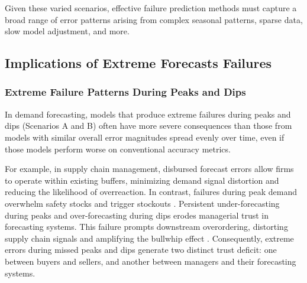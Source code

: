 \documentclass[12pt]{article}
\begin{document}
Given these varied scenarios, effective failure prediction methods must capture a broad range of error patterns arising from complex seasonal patterns, sparse data, slow model adjustment, and more.

\subsection{Implications of Extreme Forecasts Failures}

\subsubsection{Extreme Failure Patterns During Peaks and Dips}

In demand forecasting, models that produce extreme failures during peaks and dips (Scenarios A and B) often have more severe consequences than those from models with similar overall error magnitudes spread evenly over time, even if those models perform worse on conventional accuracy metrics. 

For example, in supply chain management, disbursed forecast errors allow firms to operate within existing buffers, minimizing demand signal distortion and reducing the likelihood of overreaction. In contrast, failures during peak demand overwhelm safety stocks and trigger stockouts \citep{bray2019}. Persistent under-forecasting during peaks and over-forecasting during dips erodes managerial trust in forecasting systems. This failure prompts downstream overordering, distorting supply chain signals and amplifying the bullwhip effect \citep{croson2014, wu2006}. Consequently, extreme errors during missed peaks and dips generate two distinct trust deficit: one between buyers and sellers, and another between managers and their forecasting systems.

\end{document}
